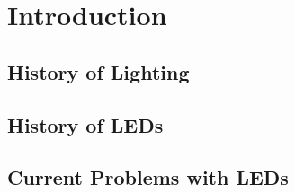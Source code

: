 
\section{Introduction}\label{introduction}

\subsection{History of Lighting}\label{history-of-lighting}

\subsection{History of LEDs}\label{history-of-leds}

\subsection{Current Problems with
LEDs}\label{current-problems-with-leds}
